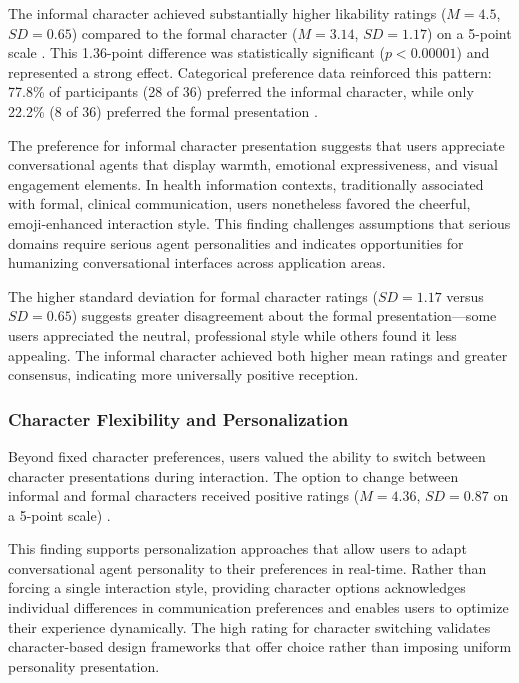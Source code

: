 \documentclass[manuscript,anonymous,sigconf]{acmart}
\begin{document}
The informal character achieved substantially higher likability ratings ($M = 4.5$, $SD = 0.65$) compared to the formal character ($M = 3.14$, $SD = 1.17$) on a 5-point scale \cite{A79}. This 1.36-point difference was statistically significant ($p < 0.00001$) and represented a strong effect. Categorical preference data reinforced this pattern: 77.8\% of participants (28 of 36) preferred the informal character, while only 22.2\% (8 of 36) preferred the formal presentation \cite{A79}.

The preference for informal character presentation suggests that users appreciate conversational agents that display warmth, emotional expressiveness, and visual engagement elements. In health information contexts, traditionally associated with formal, clinical communication, users nonetheless favored the cheerful, emoji-enhanced interaction style. This finding challenges assumptions that serious domains require serious agent personalities and indicates opportunities for humanizing conversational interfaces across application areas.

The higher standard deviation for formal character ratings ($SD = 1.17$ versus $SD = 0.65$) suggests greater disagreement about the formal presentation---some users appreciated the neutral, professional style while others found it less appealing. The informal character achieved both higher mean ratings and greater consensus, indicating more universally positive reception.

\subsubsection{Character Flexibility and Personalization}

Beyond fixed character preferences, users valued the ability to switch between character presentations during interaction. The option to change between informal and formal characters received positive ratings ($M = 4.36$, $SD = 0.87$ on a 5-point scale) \cite{A79}.

This finding supports personalization approaches that allow users to adapt conversational agent personality to their preferences in real-time. Rather than forcing a single interaction style, providing character options acknowledges individual differences in communication preferences and enables users to optimize their experience dynamically. The high rating for character switching validates character-based design frameworks that offer choice rather than imposing uniform personality presentation.
\end{document}
